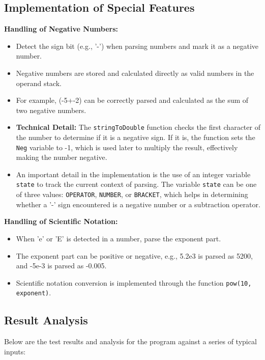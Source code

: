 \documentclass{article}
\begin{document}
\subsection{Implementation of Special Features}

\textbf{Handling of Negative Numbers:}
\begin{itemize}
    \item Detect the sign bit (e.g., '-') when parsing numbers and mark it as a negative number.
    \item Negative numbers are stored and calculated directly as valid numbers in the operand stack.
    \item For example, (-5+-2) can be correctly parsed and calculated as the sum of two negative numbers.
    \item \textbf{Technical Detail:} The \texttt{stringToDouble} function checks the first character of the number to determine if it is a negative sign. If it is, the function sets the \texttt{Neg} variable to -1, which is used later to multiply the result, effectively making the number negative.
    \item An important detail in the implementation is the use of an integer variable \texttt{state} to track the current context of parsing. The variable \texttt{state} can be one of three values: \texttt{OPERATOR}, \texttt{NUMBER}, or \texttt{BRACKET}, which helps in determining whether a '-' sign encountered is a negative number or a subtraction operator.
\end{itemize}

\textbf{Handling of Scientific Notation:}
\begin{itemize}
    \item When 'e' or 'E' is detected in a number, parse the exponent part.
    \item The exponent part can be positive or negative, e.g., 5.2e3 is parsed as 5200, and -5e-3 is parsed as -0.005.
    \item Scientific notation conversion is implemented through the function \texttt{pow(10, exponent)}.
\end{itemize}

\subsection{Result Analysis}

Below are the test results and analysis for the program against a series of typical inputs:
\end{document}

